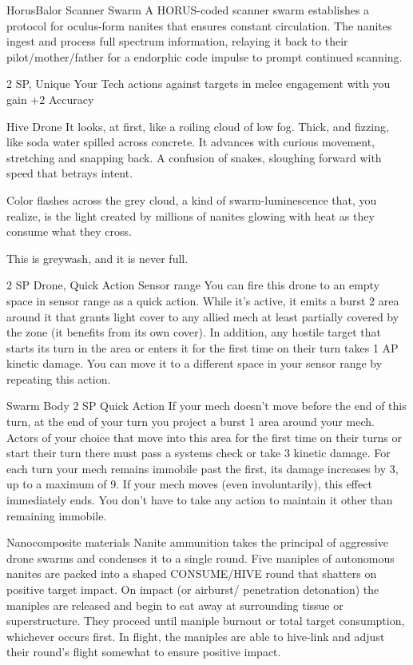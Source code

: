 \begin{mech}{Horus}{Balor}
Scanner Swarm
A HORUS-coded scanner swarm establishes a protocol for oculus-form nanites that ensures constant circulation. The nanites ingest and process full spectrum information, relaying it back to their pilot/mother/father for a endorphic code impulse to prompt continued scanning.

2 SP, Unique
Your Tech actions against targets in melee engagement with you gain +2 Accuracy

Hive Drone
It looks, at first, like a roiling cloud of low fog. Thick, and fizzing, like soda water spilled across concrete. It advances with curious movement, stretching and snapping back. A confusion of snakes, sloughing forward with speed that betrays intent.

Color flashes across the grey cloud, a kind of swarm-luminescence that, you realize, is the light created by millions of nanites glowing with heat as they consume what they cross.

This is greywash, and it is never full.

2 SP
Drone, Quick Action
Sensor range
You can fire this drone to an empty space in sensor range as a quick action. While it’s active, it emits a burst 2 area around it that grants light cover to any allied mech at least partially covered by the zone (it benefits from its own cover). In addition, any hostile target that starts its turn in the area or enters it for the first time on their turn takes 1 AP kinetic damage. You can move it to a different space in your sensor range by repeating this action.

Swarm Body
2 SP
Quick Action
If your mech doesn’t move before the end of this turn, at the end of your turn you project a burst 1 area around your mech. Actors of your choice that move into this area for the first time on their turns or start their turn there must pass a systems check or take 3 kinetic damage. For each turn your mech remains immobile past the first, its damage increases by 3, up to a maximum of 9. If your mech moves (even involuntarily), this effect immediately ends. You don’t have to take any action to maintain it other than remaining immobile.

Nanocomposite materials
Nanite ammunition takes the principal of aggressive drone swarms and condenses it to a single round. Five maniples of autonomous nanites are packed into a shaped CONSUME/HIVE round that shatters on positive target impact. On impact (or airburst/ penetration detonation) the maniples are released and begin to eat away at surrounding tissue or superstructure. They proceed until maniple burnout or total target consumption, whichever occurs first. In flight, the maniples are able to hive-link and adjust their round’s flight somewhat to ensure positive impact.


\end{mech}
